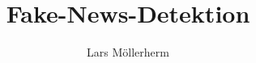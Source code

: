 \documentclass[
  12pt,
  tucolor,
  BCOR=12mm,     %
  parskip=half,  %
  open=any,      %
  cleardoublepage=plain,  %
]{tudothesis}
\author{Lars Möllerherm}
\title{Fake-News-Detektion}
\begin{document}
\onehalfspacing
\frontmatter
\maketitle

\makecorrectorpage
\tableofcontents
\mainmatter


%

\backmatter
\printbibliography
\end{document}
